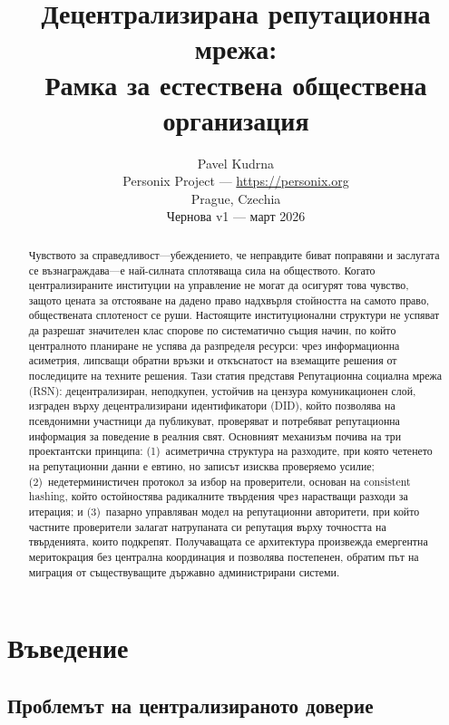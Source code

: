 \documentclass[11pt,a4paper,twocolumn]{article}
\title{\textbf{Децентрализирана репутационна мрежа:\\Рамка за естествена обществена организация}}
\author{Pavel Kudrna\\Personix Project --- \url{https://personix.org}\\Prague, Czechia\\Чернова v1 --- март 2026}
\date{}
\begin{document}
\maketitle

\begin{abstract}
Чувството за справедливост---убеждението, че неправдите биват поправяни и заслугата се възнаграждава---е най-силната сплотяваща сила на обществото. Когато централизираните институции на управление не могат да осигурят това чувство, защото цената за отстояване на дадено право надхвърля стойността на самото право, обществената сплотеност се руши. Настоящите институционални структури не успяват да разрешат значителен клас спорове по систематично същия начин, по който централното планиране не успява да разпределя ресурси: чрез информационна асиметрия, липсващи обратни връзки и откъснатост на вземащите решения от последиците на техните решения. Тази статия представя Репутационна социална мрежа (RSN): децентрализиран, неподкупен, устойчив на цензура комуникационен слой, изграден върху децентрализирани идентификатори (DID), който позволява на псевдонимни участници да публикуват, проверяват и потребяват репутационна информация за поведение в реалния свят. Основният механизъм почива на три проектантски принципа: (1)~асиметрична структура на разходите, при която четенето на репутационни данни е евтино, но записът изисква проверяемо усилие; (2)~недетерминистичен протокол за избор на проверители, основан на consistent hashing, който остойностява радикалните твърдения чрез нарастващи разходи за итерация; и (3)~пазарно управляван модел на репутационни авторитети, при който частните проверители залагат натрупаната си репутация върху точността на твърденията, които подкрепят. Получаващата се архитектура произвежда емергентна меритокрация без централна координация и позволява постепенен, обратим път на миграция от съществуващите държавно администрирани системи.
\end{abstract}

\section{Въведение}

\subsection{Проблемът на централизираното доверие}
\end{document}
